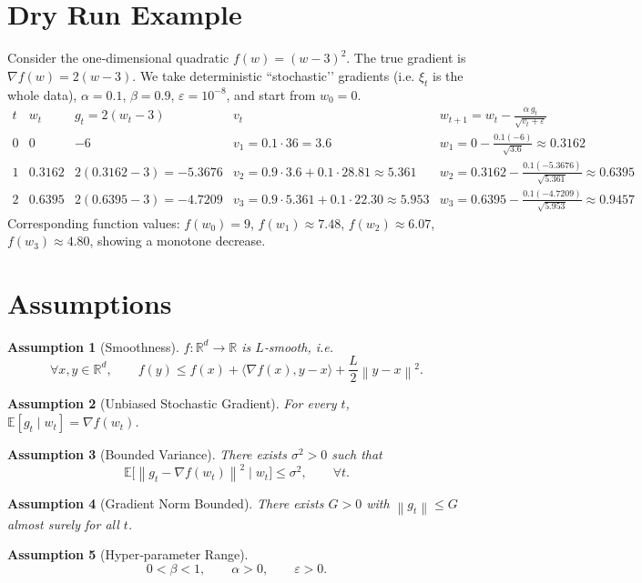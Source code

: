 \documentclass{article}
\newtheorem{assumption}{Assumption}
\newcommand{\E}{\mathbb{E}}
\newcommand{\R}{\mathbb{R}}
\newcommand{\norm}[1]{\left\lVert#1\right\rVert}
\begin{document}
\section*{Dry Run Example}
Consider the one‑dimensional quadratic $f(w)=(w-3)^2$.
The true gradient is $\nabla f(w)=2(w-3)$.
We take deterministic “stochastic’’ gradients (i.e. $\xi_t$ is the whole data),
$\alpha=0.1$, $\beta=0.9$, $\varepsilon=10^{-8}$, and start from $w_0=0$.
\[
\begin{array}{c|c|c|c|c}
t & w_t & g_t=2(w_t-3) & v_t & w_{t+1}=w_t-\displaystyle\frac{\alpha\,g_t}{\sqrt{v_t+\varepsilon}}\\ \hline
0 & 0 & -6 & v_1=0.1\cdot36=3.6 & 
w_1=0-\frac{0.1(-6)}{\sqrt{3.6}}\approx 0.3162 \\[4pt]
1 & 0.3162 & 2(0.3162-3)=-5.3676 &
v_2=0.9\cdot3.6+0.1\cdot28.81\approx 5.361 &
w_2=0.3162-\frac{0.1(-5.3676)}{\sqrt{5.361}}\approx 0.6395 \\[4pt]
2 & 0.6395 & 2(0.6395-3)=-4.7209 &
v_3=0.9\cdot5.361+0.1\cdot22.30\approx 5.953 &
w_3=0.6395-\frac{0.1(-4.7209)}{\sqrt{5.953}}\approx 0.9457
\end{array}
\]
Corresponding function values: $f(w_0)=9$, $f(w_1)\approx7.48$, $f(w_2)\approx6.07$, $f(w_3)\approx4.80$,
showing a monotone decrease.

\newpage
\section*{Assumptions}
\begin{assumption}[Smoothness]\label{ass:smooth}
$f:\R^d\rightarrow\R$ is $L$‑smooth, i.e.
\[
\forall x,y\in\R^d,\qquad 
f(y)\le f(x)+\langle\nabla f(x),y-x\rangle+\frac{L}{2}\norm{y-x}^2 .
\tag{A1}
\]
\end{assumption}
\begin{assumption}[Unbiased Stochastic Gradient]\label{ass:unbiased}
For every $t$, $\E[g_t\mid w_t]=\nabla f(w_t)$.
\end{assumption}
\begin{assumption}[Bounded Variance]\label{ass:var}
There exists $\sigma^2>0$ such that
\[
\E\bigl[\norm{g_t-\nabla f(w_t)}^2\mid w_t\bigr]\le\sigma^2,
\qquad\forall t .
\tag{A3}
\]
\end{assumption}
\begin{assumption}[Gradient Norm Bounded]\label{ass:gradbound}
There exists $G>0$ with $\norm{g_t}\le G$ almost surely for all $t$.
\end{assumption}
\begin{assumption}[Hyper‑parameter Range]\label{ass:params}
\[
0<\beta<1,\qquad \alpha>0,\qquad \varepsilon>0 .
\tag{A5}
\]
\end{assumption}
\end{document}
